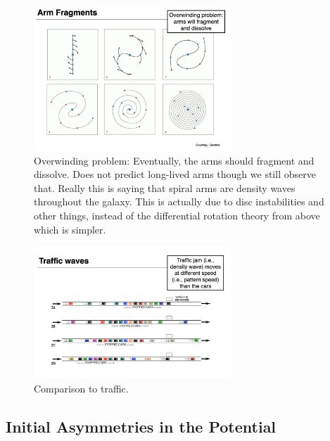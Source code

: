 \documentclass{article}
\begin{document}
\begin{figure}
    \centering
    \includegraphics[width=0.66\textwidth]{figs/Screen Shot 2021-10-27 at 10.22.11 AM.png}
    \caption{Overwinding problem: Eventually, the arms should fragment and dissolve. Does not predict long-lived arms though we still observe that. Really this is saying that spiral arms are density waves throughout the galaxy. This is actually due to disc instabilities and other things, instead of the differential rotation theory from above which is simpler. }
    \label{fig:desnity_waves}
\end{figure}

\begin{figure}
    \centering
    \includegraphics[width=0.66\textwidth]{figs/Screen Shot 2021-10-27 at 10.24.21 AM.png}
    \caption{Comparison to traffic.}
    \label{fig:Traffic}
\end{figure}

\subsection{Initial Asymmetries in the Potential}
\end{document}
